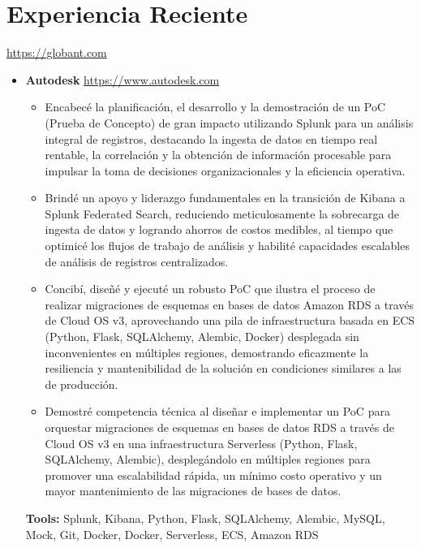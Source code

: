 \documentclass[11pt,a4paper,english]{moderncv}
\begin{document}
\maketitle

\section{Experiencia Reciente}

{
\url{https://globant.com}
\newline{}
\begin{itemize}
    \item \textbf{Autodesk}
        \newline{}
        \url{https://www.autodesk.com}
        \begin{itemize}
            \item Encabecé la planificación, el desarrollo y la demostración de un PoC (Prueba de Concepto) de gran impacto utilizando Splunk para un análisis integral de registros, destacando la ingesta de datos en tiempo real rentable, la correlación y la obtención de información procesable para impulsar la toma de decisiones organizacionales y la eficiencia operativa.
            \item Brindé un apoyo y liderazgo fundamentales en la transición de Kibana a Splunk Federated Search, reduciendo meticulosamente la sobrecarga de ingesta de datos y logrando ahorros de costos medibles, al tiempo que optimicé los flujos de trabajo de análisis y habilité capacidades escalables de análisis de registros centralizados.
            \item Concibí, diseñé y ejecuté un robusto PoC que ilustra el proceso de realizar migraciones de esquemas en bases de datos Amazon RDS a través de Cloud OS v3, aprovechando una pila de infraestructura basada en ECS (Python, Flask, SQLAlchemy, Alembic, Docker) desplegada sin inconvenientes en múltiples regiones, demostrando eficazmente la resiliencia y mantenibilidad de la solución en condiciones similares a las de producción.
            \item Demostré competencia técnica al diseñar e implementar un PoC para orquestar migraciones de esquemas en bases de datos RDS a través de Cloud OS v3 en una infraestructura Serverless (Python, Flask, SQLAlchemy, Alembic), desplegándolo en múltiples regiones para promover una escalabilidad rápida, un mínimo costo operativo y un mayor mantenimiento de las migraciones de bases de datos.
        \end{itemize}
        \textbf{Tools:} Splunk, Kibana, Python, Flask, SQLAlchemy, Alembic, MySQL, Mock, Git, Docker, Docker, Serverless, ECS, Amazon RDS
\end{itemize}
}
\end{document}
